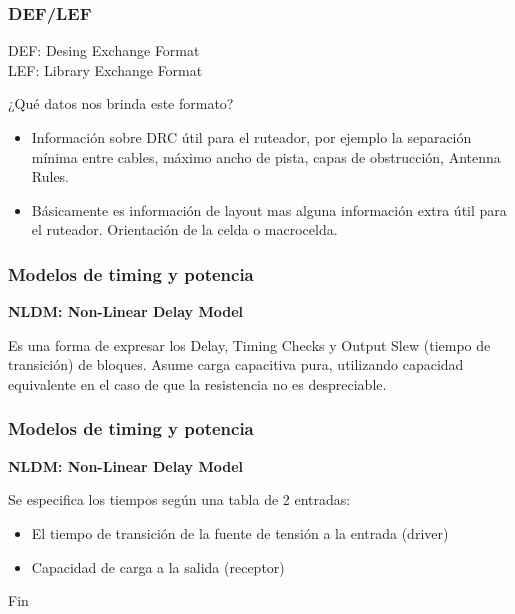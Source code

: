 \documentclass{beamer}
\begin{document}
\begin{frame}
\frametitle{DEF/LEF}
DEF: Desing Exchange Format \\
LEF: Library Exchange Format \\

\begin{center}¿Qué datos nos brinda este formato?
\end{center}
    \begin{itemize}
    \item Informaci\'on sobre DRC \'util para el ruteador, por ejemplo la separación mínima entre cables, m\'aximo ancho de pista, capas de obstrucción, Antenna Rules.
    \item B\'asicamente es informaci\'on de layout mas alguna informaci\'on extra \'util para el ruteador. Orientaci\'on de la celda o macrocelda.  
    \end{itemize}
\end{frame}

\begin{frame}
  \frametitle{Modelos de timing y potencia} 

\textbf{NLDM: Non-Linear Delay Model} 

Es una forma de expresar los Delay, Timing Checks y Output Slew (tiempo de transici\'on) de bloques. Asume carga capacitiva pura, utilizando capacidad equivalente en el caso de que la resistencia no es despreciable. 
 
\end{frame}

\begin{frame}
  \frametitle{Modelos de timing y potencia} 

 \textbf{NLDM: Non-Linear Delay Model} 
   \begin{figure}[ht]
      \centering
    \end{figure}
    Se especifica los tiempos según una tabla de 2 entradas:
    \begin{itemize}
	\item El tiempo de transición de la fuente de tensión a la entrada (driver)
	\item Capacidad de carga a la salida (receptor)
\end{itemize}

\end{frame}


\begin{frame}
\Huge{\centerline{Fin}}
\end{frame}

\end{document}
